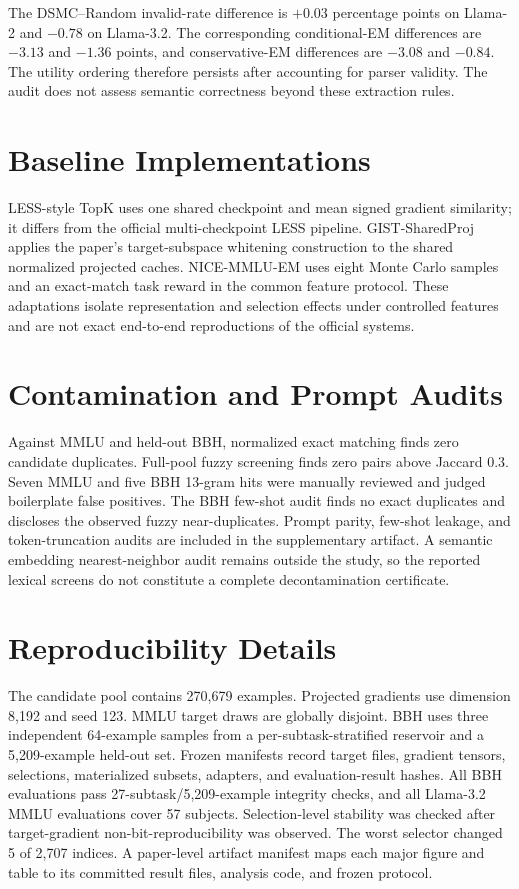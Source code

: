 \documentclass{article}
\newcommand{\method}{\textsc{DSMC}}
\begin{document}
The \method{}--Random invalid-rate difference is $+0.03$ percentage points on
Llama-2 and $-0.78$ on Llama-3.2. The corresponding conditional-EM
differences are $-3.13$ and $-1.36$ points, and conservative-EM differences
are $-3.08$ and $-0.84$. The utility ordering therefore persists after
accounting for parser validity. The audit does not assess semantic correctness
beyond these extraction rules.

\section{Baseline Implementations}
\label{app:baselines}

LESS-style TopK uses one shared checkpoint and mean signed gradient similarity;
it differs from the official multi-checkpoint LESS pipeline. GIST-SharedProj
applies the paper's target-subspace whitening construction to the shared
normalized projected caches. NICE-MMLU-EM uses eight Monte Carlo samples and
an exact-match task reward in the common feature protocol. These adaptations
isolate representation and selection effects under controlled features and
are not exact end-to-end reproductions of the official systems.

\section{Contamination and Prompt Audits}
\label{app:audits}

Against MMLU and held-out BBH, normalized exact matching finds zero candidate
duplicates. Full-pool fuzzy screening finds zero pairs above Jaccard 0.3.
Seven MMLU and five BBH 13-gram hits were manually reviewed and judged
boilerplate false positives. The BBH few-shot audit finds no exact duplicates
and discloses the observed fuzzy near-duplicates. Prompt parity, few-shot
leakage, and token-truncation audits are included in the supplementary
artifact. A semantic embedding nearest-neighbor audit remains outside the
study, so the reported lexical screens do not constitute a complete
decontamination certificate.

\section{Reproducibility Details}
\label{app:repro}

The candidate pool contains 270,679 examples. Projected gradients use dimension
8,192 and seed 123. MMLU target draws are globally disjoint. BBH uses three
independent 64-example samples from a per-subtask-stratified reservoir and a
5,209-example held-out set. Frozen manifests record target files, gradient
tensors, selections, materialized
subsets, adapters, and evaluation-result hashes. All BBH evaluations pass
27-subtask/5,209-example integrity checks, and all Llama-3.2 MMLU evaluations
cover 57 subjects. Selection-level stability was checked after target-gradient
non-bit-reproducibility was observed. The worst selector changed 5 of 2,707
indices. A paper-level artifact manifest maps each major figure and table to
its committed result files, analysis code, and frozen protocol.
\end{document}
